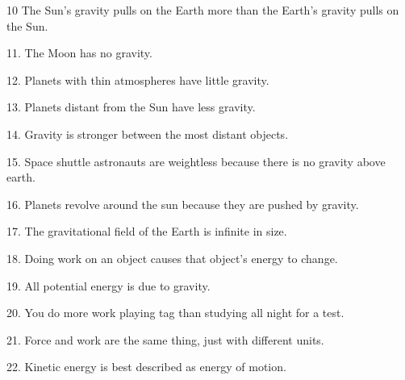 \documentclass[12pt]{examdesign}
\begin{document}
\begin{truefalse} [title={True or False},
	rearrange=no]
	\begin{question}
		 10 The Sun's gravity pulls on the Earth more than the Earth's gravity pulls on the Sun.  
	\end{question}
	\begin{question}
		 11. The Moon has no gravity.
	\end{question}

	\begin{question}
	 12. Planets with thin atmospheres have little gravity.
\end{question}

	\begin{question}
	 13. Planets distant from the Sun have less gravity.
\end{question}

	\begin{question}
	 14. Gravity is stronger between the most distant objects.
\end{question}

	\begin{question}
	 15. Space shuttle astronauts are weightless because there is no gravity above earth.
\end{question}


\begin{question}
	 16. Planets revolve around the sun because they are pushed by gravity.
\end{question}



\begin{question}
		 17. The gravitational field of the Earth is infinite in size. 
	\end{question}
		
			\begin{question}
			 18. Doing work on an object causes that object's energy to change.
		\end{question}
		\begin{question}
			 19. All potential energy is due to gravity.
		\end{question}
		\begin{question}
			 20. You do more work playing tag than studying all night for a test.
		\end{question}
		
		\begin{question}
			 21. Force and work are the same thing, just with different units.
		\end{question}
		\begin{question}
			 22. Kinetic energy is best described as energy of motion.
		\end{question}
		

\end{truefalse}
\end{document}
